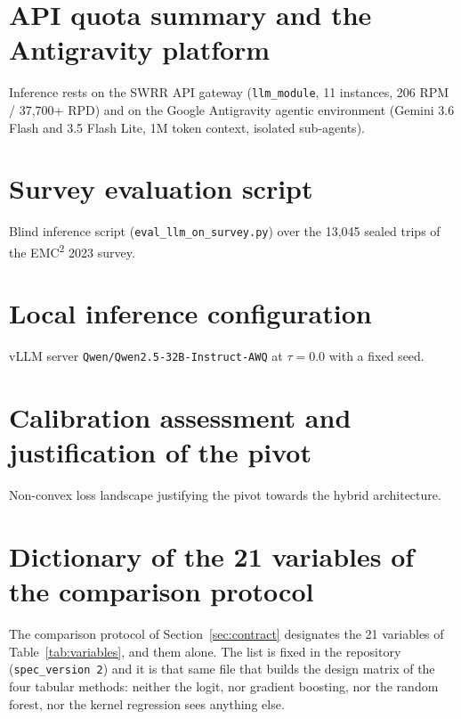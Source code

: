 \section{API quota summary and the Antigravity platform}
\label{app:quotas}

Inference rests on the SWRR API gateway (\texttt{llm\_module}, 11 instances, 206 RPM / 37{,}700+ RPD) and on the Google Antigravity agentic environment (Gemini 3.6 Flash and 3.5 Flash Lite, 1M token context, isolated sub-agents).

\section{Survey evaluation script}
\label{app:evalscript}

Blind inference script (\texttt{eval\_llm\_on\_survey.py}) over the 13{,}045 sealed trips of the EMC\textsuperscript{2} 2023 survey.

\section{Local inference configuration}
\label{app:qwen}

vLLM server \texttt{Qwen/Qwen2.5-32B-Instruct-AWQ} at $\tau = 0.0$ with a fixed seed.

\section{Calibration assessment and justification of the pivot}
\label{app:pivot}

Non-convex loss landscape justifying the pivot towards the hybrid architecture.

\section{Dictionary of the 21 variables of the comparison protocol}
\label{app:variables}

The comparison protocol of Section~\ref{sec:contract} designates the 21 variables of Table~\ref{tab:variables}, and them alone. The list is fixed in the repository (\texttt{spec\_version 2}) and it is that same file that builds the design matrix of the four tabular methods: neither the logit, nor gradient boosting, nor the random forest, nor the kernel regression sees anything else.


